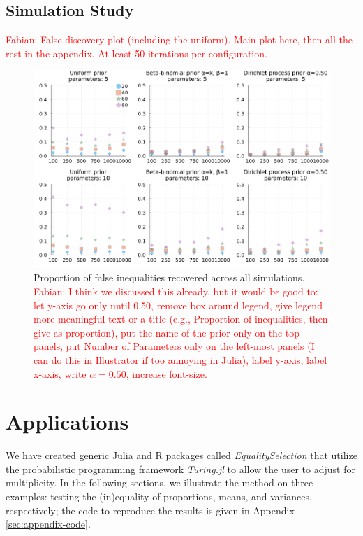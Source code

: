 \documentclass[11pt,a4paper]{article}
\theoremstyle{definition} %
\theoremstyle{case}
\newcommand{\FD}[1]{\textcolor{red}{Fabian: #1 }}
\begin{document}
\subsection{Simulation Study} \label{sec:simulation}
\FD{False discovery plot (including the uniform). Main plot here, then all the rest in the appendix. At least 50 iterations per configuration.}

\begin{figure}
    \centering
    \includegraphics[width=\textwidth]{figures/simulation_results_test_clean_figures/simulation_manuscript.pdf}
    \caption{Proportion of false inequalities recovered across all simulations. \FD{I think we discussed this already, but it would be good to: let y-axis go only until 0.50, remove box around legend, give legend more meaningful text or a title (e.g., Proportion of inequalities, then give as proportion), put the name of the prior only on the top panels, put Number of Parameters only on the left-most panels (I can do this in Illustrator if too annoying in Julia), label y-axis, label x-axis, write $\alpha = 0.50$, increase font-size.}}
    \label{fig:big_simulation}
\end{figure}

\section{Applications} \label{sec:applications}
We have created generic Julia and R packages called \textit{EqualitySelection} that utilize the probabilistic programming framework \textit{Turing.jl} to allow the user to adjust for multiplicity. In the following sections, we illustrate the method on three examples: testing the (in)equality of proportions, means, and variances, respectively; the code to reproduce the results is given in Appendix \ref{sec:appendix-code}.
\end{document}
